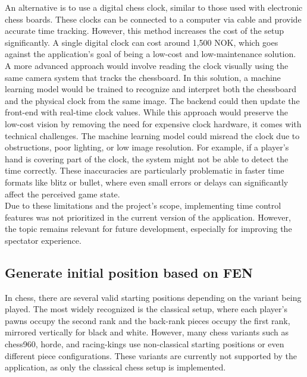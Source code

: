 An alternative is to use a digital chess clock, similar to those used with electronic chess boards. These clocks can be connected to a computer via cable and provide accurate time tracking. However, this method increases the cost of the setup significantly. A single digital clock can cost around 1,500 NOK, which goes against the application’s goal of being a low-cost and low-maintenance solution. \\

A more advanced approach would involve reading the clock visually using the same camera system that tracks the chessboard. In this solution, a machine learning model would be trained to recognize and interpret both the chessboard and the physical clock from the same image. The backend could then update the front-end with real-time clock values. While this approach would preserve the low-cost vision by removing the need for expensive clock hardware, it comes with technical challenges. The machine learning model could misread the clock due to obstructions, poor lighting, or low image resolution. For example, if a player’s hand is covering part of the clock, the system might not be able to detect the time correctly. These inaccuracies are particularly problematic in faster time formats like blitz or bullet, where even small errors or delays can significantly affect the perceived game state. \\

Due to these limitations and the project's scope, implementing time control features was not prioritized in the current version of the application. However, the topic remains relevant for future development, especially for improving the spectator experience.

\subsection{Generate initial position based on FEN}
In chess, there are several valid starting positions depending on the variant being played. The most widely recognized is the \gls{classical} setup, where each player's pawns occupy the second rank and the back-rank pieces occupy the first rank, mirrored vertically for black and white. However, many chess variants such as \gls{chess960}, \gls{horde}, and \gls{racing-kings} use non-classical starting positions or even different piece configurations. These variants are currently not supported by the application, as only the classical chess setup is implemented. \\

